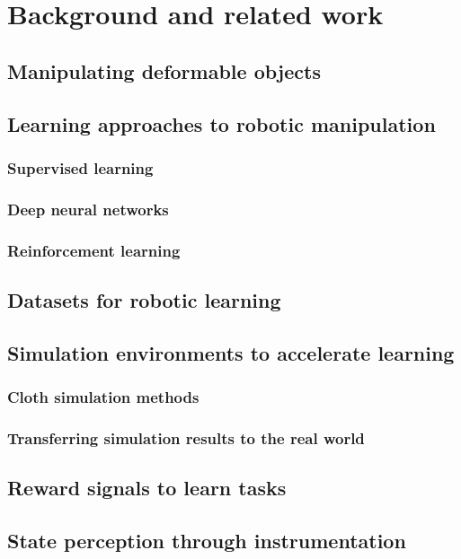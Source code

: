 \documentclass[\home/main.tex]{subfiles}
\begin{document}
\chapter{Background and related work}\label{sota} 
\section{Manipulating deformable objects} 

\section{Learning approaches to robotic manipulation} %
\subsection{Supervised learning}
\subsection{Deep neural networks}
\subsection{Reinforcement learning}

\section{Datasets for robotic learning}
\section{Simulation environments to accelerate learning}
\subsection{Cloth simulation methods}
\subsection{Transferring simulation results to the real world}
\section{Reward signals to learn tasks}
\section{State perception through instrumentation}
\end{document}
